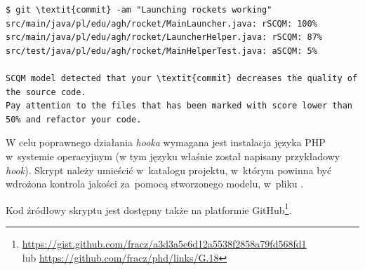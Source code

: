 \documentclass[twoside]{praca}
\begin{document}
\begin{lstlisting}[frame=single,caption={Próba wprowadzenia zmiany kodu zbyt niskiej jakości zablokowanej przez hook integrujący projekt z~SCQM},captionpos=b,label={lst:eval:hook-bad}]
$ git \textit{commit} -am "Launching rockets working"
src/main/java/pl/edu/agh/rocket/MainLauncher.java: rSCQM: 100%
src/main/java/pl/edu/agh/rocket/LauncherHelper.java: rSCQM: 87%
src/test/java/pl/edu/agh/rocket/MainHelperTest.java: aSCQM: 5%

SCQM model detected that your \textit{commit} decreases the quality of the source code.
Pay attention to the files that has been marked with score lower than 50% and refactor your code.
\end{lstlisting}


W celu poprawnego działania \textit{hooka} wymagana jest instalacja języka PHP w~systemie operacyjnym (w tym języku właśnie został napisany przykładowy \textit{hook}). Skrypt należy umieścić w~katalogu projektu, w~którym powinna być wdrożona kontrola jakości za~pomocą stworzonego modelu, w~pliku .

Kod źródłowy skryptu jest dostępny także na platformie GitHub\footnote{\url{https://gist.github.com/fracz/a3d3a5e6d12a5538f2858a79fd568fd1}\\lub \url{https://github.com/fracz/phd/links/G.18}}.
\end{document}
